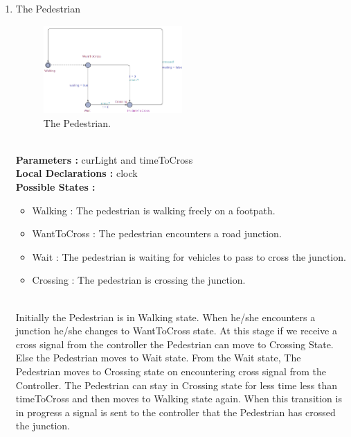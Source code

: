 \documentclass[conference]{IEEEtran}
\begin{document}
\begin{enumerate}
    \item The Pedestrian
    \begin{figure}[H]
        \centering
        \includegraphics[width=0.5\textwidth]{Fig 3.png}
    \caption{The Pedestrian.}
    \end{figure}
    \\
    \textbf{Parameters :} curLight and timeToCross
    \\
    \textbf{Local Declarations :} clock
    \\
    \textbf{Possible States :}
    \begin{itemize}
        \item Walking : The pedestrian is walking freely on a footpath.
        \item WantToCross : The pedestrian encounters a road junction.
        \item Wait : The pedestrian is waiting for vehicles to pass to cross the junction.
        \item Crossing : The pedestrian is crossing the junction.

    \end{itemize}
    \\
    Initially the Pedestrian is in Walking state. When he/she encounters a junction he/she changes to WantToCross state. At this stage if we receive a cross signal from the controller the Pedestrian can move to Crossing State. Else the Pedestrian moves to Wait state. From the Wait state, The Pedestrian moves to Crossing state on encountering cross signal from the Controller. The Pedestrian can stay in Crossing state for less time less than  timeToCross and then moves to Walking state again. When this transition is in progress a signal is sent to the controller that the Pedestrian has crossed the junction.
    \\
    

\end{enumerate}
\end{document}
